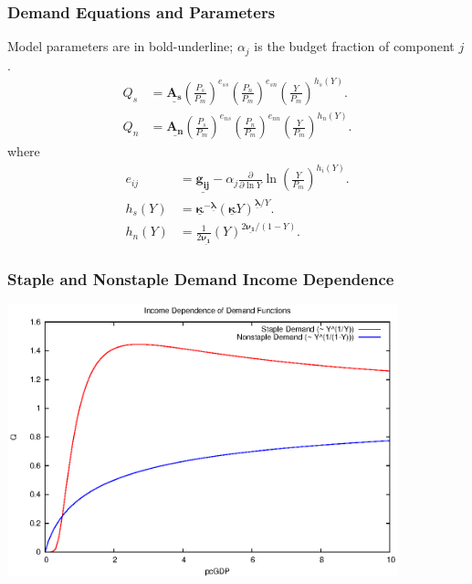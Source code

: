 \documentclass{beamer}
\begin{document}
\newcommand{\bmu}[1]{\underline{\boldsymbol{#1}}}

\begin{frame}
  \frametitle{Demand Equations and Parameters}
  Model parameters are in bold-underline; $\alpha_j$ is the budget
  fraction of component $j$.
    \begin{align}
    Q_s &=
    \bmu{A_s}\left(\frac{P_s}{P_m}\right)^{e_{ss}}\left(\frac{P_n}{P_m}\right)^{e_{sn}}\left(\frac{Y}{P_m}\right)^{h_s(Y)}.\\
    Q_n &=
    \bmu{A_n}\left(\frac{P_s}{P_m}\right)^{e_{ns}}\left(\frac{P_n}{P_m}\right)^{e_{nn}}\left(\frac{Y}{P_m}\right)^{h_n(Y)}.
    \end{align}
    where
    \begin{align}
      e_{ij} &= \bmu{g_{ij}} - \alpha_j
      \frac{\partial}{\partial \ln Y} \ln\left(\frac{Y}{P_m}\right)^{h_i(Y)}.\\
      h_s(Y) &= \bmu{\kappa}^{-\bmu{\lambda}}
      \left(\bmu{\kappa}Y\right)^{\bmu{\lambda}/Y}.\\
      h_n(Y) &= \frac{1}{2\bmu{\nu_1}}\left(Y\right)^{2\bmu{\nu_1}/\left(1-Y\right)}.
    \end{align}
\end{frame}

\begin{frame}
  \frametitle{Staple and Nonstaple Demand Income Dependence}
  \begin{center}
    \includegraphics[width=0.85\textwidth]{fig/yfuncs.eps}
  \end{center}
\end{frame}
\end{document}
